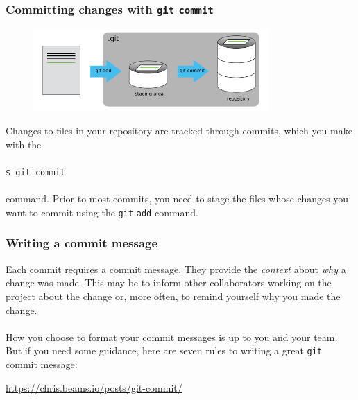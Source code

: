 \documentclass{beamer}
\begin{document}
\begin{frame}
   \frametitle{Committing changes with \texttt{git} \texttt{commit}}
   \begin{figure}[htbp]
      \includegraphics[width=0.8\textwidth]{images/git-staging-area.png}
   \end{figure}
   Changes to files in your repository are tracked through commits, 
   which you make with the 
   \\ \ \\
   \texttt{\hspace{1.0em}\$ git commit}
   \\ \ \\ 
   command. Prior to most commits, you need to stage the files whose 
   changes you want to commit using the \texttt{git} \texttt{add} 
   command.
\end{frame}

\begin{frame}
   \frametitle{Writing a commit message}
   Each commit requires a commit message. They provide the 
   \textit{context} about \textit{why} a change was made. This may be 
   to inform other collaborators working on the project about the change 
   or, more often, to remind yourself why you made the change.
   \\ \ \\
   How you choose to format your commit messages is up to you and your 
   team. But if you need some guidance, here are seven rules to writing a 
   great \texttt{git} commit message: \\
   \begin{center}
      \url{https://chris.beams.io/posts/git-commit/}
   \end{center}
\end{frame}
\end{document}
